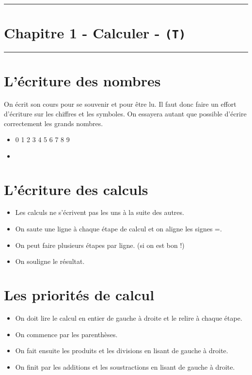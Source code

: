 \documentclass[11pt]{article}
\newcommand{\horrule}[1]{\rule{\linewidth}{#1}} %
\begin{document}
\setlength{\columnseprule}{1pt}

\horrule{2px}
\section*{Chapitre 1 - Calculer - \texttt{(T)}}
\horrule{2px}

\section*{L'écriture des nombres}

On écrit son cours pour se souvenir et pour être lu. Il faut donc faire un effort d'écriture sur les chiffres et les symboles. On essayera autant que possible d'écrire correctement les grands nombres. 

\begin{itemize}
  \item 0 1 2 3 4 5 6 7 8 9
  \item {}
\end{itemize} 


\section*{L'écriture des calculs}

\begin{itemize}
  \item Les calculs ne s'écrivent pas les uns à la suite des autres. 
  \item On saute une ligne à chaque étape de calcul et on aligne les signes =.
  \item On peut faire plusieurs étapes par ligne. (si on est bon !)
  \item On souligne le résultat.
\end{itemize}

\section*{Les priorités de calcul}

\begin{itemize}
  \item On doit lire le calcul en entier de gauche à droite et le relire à chaque étape.
  \item On commence par les parenthèses.
  \item On fait ensuite les produits et les divisions en lisant de gauche à droite.
  \item On finit par les additions et les soustractions en lisant de gauche à droite.
\end{itemize}
\end{document}
